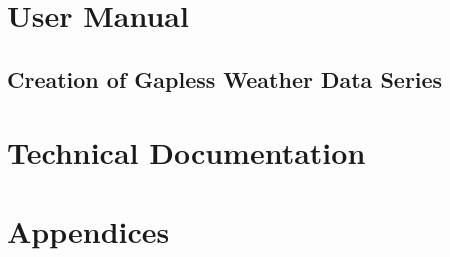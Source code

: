 \documentclass[12pt, letterpaper, fleqn]{report}
\begin{document}


\tableofcontents

\listoffigures

\part{User Manual}

\chapter{Creation of Gapless Weather Data Series }\label{chap:gapfilling}

\part{Technical Documentation}


\part{Appendices}

\appendix



\end{document}
